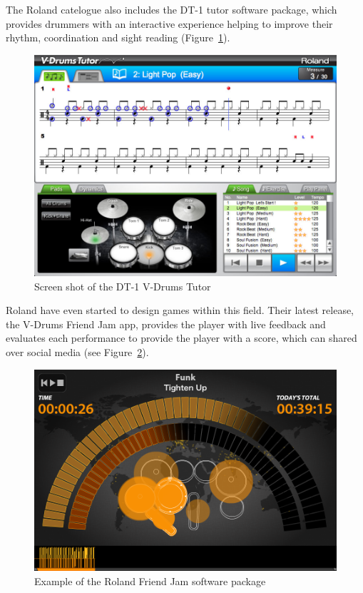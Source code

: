 \documentclass[a4paper, 11pt]{article}
\begin{document}
The Roland catelogue also includes the DT-1 tutor software package, which provides drummers with an interactive experience helping to improve their rhythm, coordination and sight reading (Figure~\ref{fig: dt-1}).\par 
\begin{figure}[ht]
\centering
  \centering
  \includegraphics[width=0.75\linewidth]{images/dt-1_ss_main_notation_gal.jpg}
  \caption{Screen shot of the DT-1 V-Drums Tutor}
  \label{fig: dt-1}
\end{figure}
Roland have even started to design games within this field. Their latest release, the V-Drums Friend Jam app, provides the player with live feedback and evaluates each performance to provide the player with a score, which can shared over social media (see Figure~\ref{fig: friendjam}). \par

\begin{figure}[htbp]
\centering
\includegraphics[scale=0.175]{images/friendjam.png}
\caption{Example of the Roland Friend Jam software package}
\label{fig: friendjam}
\end{figure}
\end{document}
